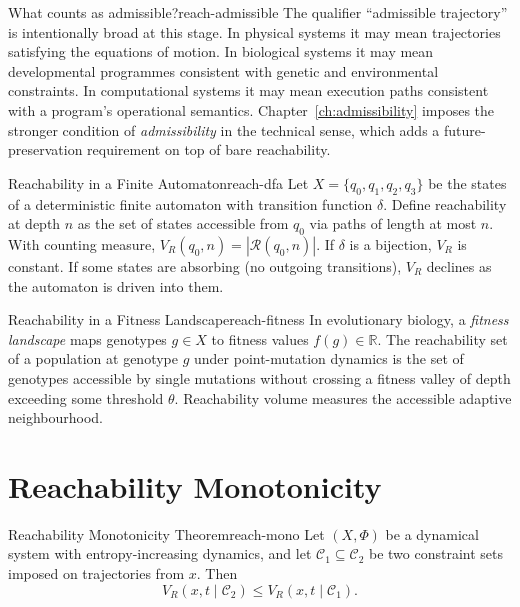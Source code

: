 \documentclass[12pt,twoside,openright]{book}
\newcommand{\csicon} {\marginpar{\tiny\color{DistBlue}\faCode}}
\newcommand{\bioicon}{\marginpar{\tiny\color{DistTeal}\faDna}}
\newcommand{\reach}{\mathcal{R}}
\begin{document}
\begin{remark}{What counts as admissible?}{reach-admissible}
  The qualifier ``admissible trajectory'' is intentionally
  broad at this stage. In physical systems it may mean
  trajectories satisfying the equations of motion. In
  biological systems it may mean developmental programmes
  consistent with genetic and environmental constraints. In
  computational systems it may mean execution paths
  consistent with a program's operational semantics.
  Chapter~\ref{ch:admissibility} imposes the stronger
  condition of \emph{admissibility} in the technical sense,
  which adds a future-preservation requirement on top of
  bare reachability.
\end{remark}

\begin{example}{Reachability in a Finite Automaton}{reach-dfa}
  \csicon
  Let $X = \{q_0,q_1,q_2,q_3\}$ be the states of a
  deterministic finite automaton with transition function
  $\delta$. Define reachability at depth $n$ as the set of
  states accessible from $q_0$ via paths of length at most
  $n$. With counting measure, $V_R(q_0,n) = |\reach(q_0,n)|$.
  If $\delta$ is a bijection, $V_R$ is constant. If some
  states are absorbing (no outgoing transitions), $V_R$
  declines as the automaton is driven into them.
\end{example}

\begin{example}{Reachability in a Fitness Landscape}{reach-fitness}
  \bioicon
  In evolutionary biology, a \emph{fitness landscape} maps
  genotypes $g\in X$ to fitness values $f(g)\in\mathbb{R}$.
  The reachability set of a population at genotype $g$
  under point-mutation dynamics is the set of genotypes
  accessible by single mutations without crossing a fitness
  valley of depth exceeding some threshold $\theta$.
  Reachability volume measures the accessible adaptive
  neighbourhood.
\end{example}

\section{Reachability Monotonicity}
\label{sec:ch13-monotone}

\begin{theorem}{Reachability Monotonicity Theorem}{reach-mono}
  Let $(X,\Phi)$ be a dynamical system with
  entropy-increasing dynamics, and let
  $\mathcal{C}_1\subseteq\mathcal{C}_2$ be two constraint
  sets imposed on trajectories from $x$. Then
  \[
    V_R(x,t\mid\mathcal{C}_2) \le V_R(x,t\mid\mathcal{C}_1).
  \]
\end{theorem}
\end{document}
